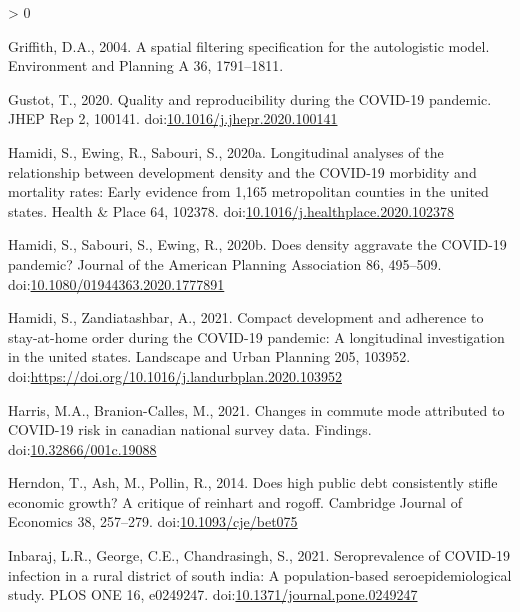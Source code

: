 \documentclass[]{elsarticle} %
\newlength{\cslhangindent}
\newenvironment{CSLReferences}[2] %
 {%
  \setlength{\parindent}{0pt}
  \ifodd #1 \everypar{\setlength{\hangindent}{\cslhangindent}}\ignorespaces\fi
  \ifnum #2 > 0
  \setlength{\parskip}{#2\baselineskip}
  \fi
 }%
 {}
\begin{document}
\begin{CSLReferences}{1}{0}
\leavevmode\hypertarget{ref-Griffith2004spatial}{}%
Griffith, D.A., 2004. A spatial filtering specification for the
autologistic model. Environment and Planning A 36, 1791--1811.

\leavevmode\hypertarget{ref-Gustot2020quality}{}%
Gustot, T., 2020. Quality and reproducibility during the COVID-19
pandemic. JHEP Rep 2, 100141.
doi:\href{https://doi.org/10.1016/j.jhepr.2020.100141}{10.1016/j.jhepr.2020.100141}

\leavevmode\hypertarget{ref-Hamidi2020longitudinal}{}%
Hamidi, S., Ewing, R., Sabouri, S., 2020a. Longitudinal analyses of the
relationship between development density and the COVID-19 morbidity and
mortality rates: Early evidence from 1,165 metropolitan counties in the
united states. Health \& Place 64, 102378.
doi:\href{https://doi.org/10.1016/j.healthplace.2020.102378}{10.1016/j.healthplace.2020.102378}

\leavevmode\hypertarget{ref-Hamidi2020density}{}%
Hamidi, S., Sabouri, S., Ewing, R., 2020b. Does density aggravate the
COVID-19 pandemic? Journal of the American Planning Association 86,
495--509.
doi:\href{https://doi.org/10.1080/01944363.2020.1777891}{10.1080/01944363.2020.1777891}

\leavevmode\hypertarget{ref-Hamidi2021compact}{}%
Hamidi, S., Zandiatashbar, A., 2021. Compact development and adherence
to stay-at-home order during the COVID-19 pandemic: A longitudinal
investigation in the united states. Landscape and Urban Planning 205,
103952. doi:\url{https://doi.org/10.1016/j.landurbplan.2020.103952}

\leavevmode\hypertarget{ref-Harris2021Changes}{}%
Harris, M.A., Branion-Calles, M., 2021. Changes in commute mode
attributed to COVID-19 risk in canadian national survey data. Findings.
doi:\href{https://doi.org/10.32866/001c.19088}{10.32866/001c.19088}

\leavevmode\hypertarget{ref-Herndon2014high}{}%
Herndon, T., Ash, M., Pollin, R., 2014. Does high public debt
consistently stifle economic growth? A critique of reinhart and rogoff.
Cambridge Journal of Economics 38, 257--279.
doi:\href{https://doi.org/10.1093/cje/bet075}{10.1093/cje/bet075}

\leavevmode\hypertarget{ref-Inbaraj2021seroprevalence}{}%
Inbaraj, L.R., George, C.E., Chandrasingh, S., 2021. Seroprevalence of
COVID-19 infection in a rural district of south india: A
population-based seroepidemiological study. PLOS ONE 16, e0249247.
doi:\href{https://doi.org/10.1371/journal.pone.0249247}{10.1371/journal.pone.0249247}


\end{CSLReferences}
\end{document}
